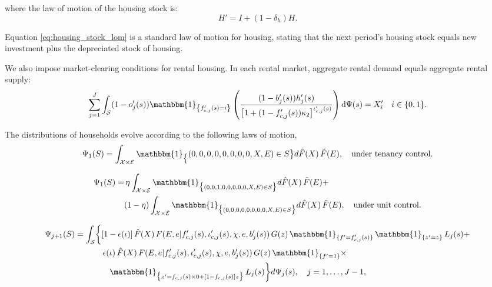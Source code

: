 \documentclass[parskip=full]{article}
\begin{document}
\noindent where the law of motion of the housing stock is: 
\begin{equation}\label{eq:housing_stock_lom}
H'=I+(1-\delta_h)H.
\end{equation}

\noindent Equation \eqref{eq:housing_stock_lom} is a standard law of motion for housing, stating that the next period's housing stock equals new investment plus the depreciated stock of housing. 

We also impose market-clearing conditions for rental housing. In each rental market, aggregate rental demand equals aggregate rental supply:
\begin{equation}\label{eq:rental_housing_clearing_condition}
  \sum_{j=1}^J \int_\mathcal{S} (1-o'_{j}(s))\mathbbm{1}_{\left\{f'_{c,j}(s)=i\right\}}\left(\frac{(1-b'_{j}(s))h'_{j}(s)}{\left[1+(1-f'_{c,j}(s))\kappa_{2}\right]^{\iota'_{c,j}(s)}}\right) \mathrm{d}\Psi(s) = X'_{i} \quad i \in \{0,1\}.
\end{equation}

The distributions of households evolve according to the following laws of motion,
\begin{equation}\label{eq:lom1}
\Psi_{1}(S) = \int_{\mathcal{X} \times \mathcal{E}} \mathbbm{1}_\big\{ (0,0,0,0,0,0,0,0,X,E) \in S \big\} d\hat{F}(X)\, \tilde{F}(E), \quad \text{under tenancy control.}
\end{equation}

\begin{equation}\label{eq:lom1_2}
\begin{split}
\Psi_{1}(S) = & \, \eta \int_{\mathcal{X} \times \mathcal{E}} \mathbbm{1}_{\big\{ (0,0,1,0,0,0,0,0,X,E) \in S \big\}} d\hat{F}(X)\, \tilde{F}(E)+ \\ & (1-\eta) \int_{\mathcal{X} \times \mathcal{E}} \mathbbm{1}_{\big\{ (0,0,0,0,0,0,0,0,X,E) \in S \big\}} d\hat{F}(X)\, \tilde{F}(E), \quad \text{under unit control.}
\end{split}
\end{equation}

\begin{equation}\label{eq:lom2}
\begin{split}
\Psi_{j+1}(S) = \int_{\mathcal{S}} \biggl\{ 
& [1-\epsilon(\iota)]\, \hat{F}(X)\, F(E,e | f'_{c,j}(s), \iota'_{c,j}(s), \chi, e, b'_j(s))\, G(z)\, \mathbbm{1}_{\{ f' = f'_{c,j}(s) \}}\, \mathbbm{1}_{\{ z' = z \}}\, L_j(s)+ \\ & \, \epsilon(\iota)\, \hat{F}(X)\, F(E,e | f'_{c,j}(s), \iota'_{c,j}(s), \chi, e, b'_j(s))\, G(z)\, \mathbbm{1}_{\{ f' = 1 \}} \times \\ & \quad  \mathbbm{1}_{\big\{ z' = f_{c,j}(s) \times 0 + [1 - f_{c,j}(s)] z \big\}}\, L_j(s)
\biggr\} d\Psi_j(s), \quad j=1,\ldots,J-1,
\end{split}
\end{equation}
\end{document}
